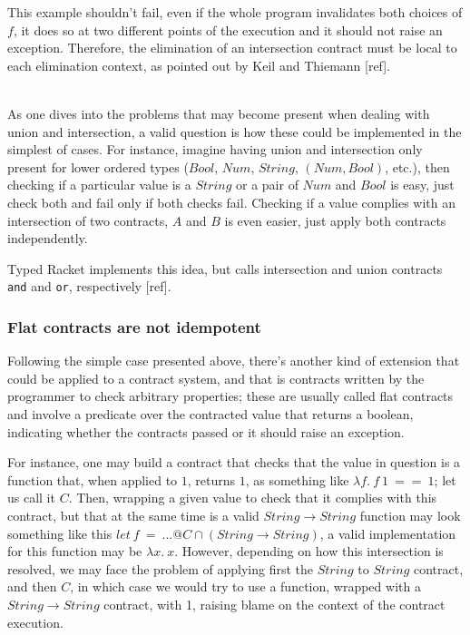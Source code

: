 This example shouldn't fail, even if the whole program invalidates both choices of $f$, it does
so at two different points of the execution and it should not raise an exception.
Therefore, the elimination of an intersection contract must be local to each elimination
context, as pointed out by Keil and Thiemann [ref].

\\


As one dives into the problems that may become present when dealing with union and intersection,
a valid question is how these could be implemented in the simplest of cases.
For instance, imagine having
union and intersection only present for lower ordered types 
($Bool$, $Num$, $String$, $(Num, Bool)$, etc.), then checking
if a particular value is a $String$ or a pair of $Num$ and $Bool$ is easy,
just check both and fail only if both checks fail.
Checking if a value complies with an intersection of two contracts, $A$ and $B$ is even
easier, just apply both contracts independently.

Typed Racket implements this idea, but calls intersection and union contracts
\texttt{and} and \texttt{or}, respectively [ref].


\subsubsection*{Flat contracts are not idempotent}

Following the simple case presented above, there's another kind of extension that could be
applied to a contract system, and that is contracts written by the
programmer to check arbitrary properties; these are usually called flat contracts and
involve a predicate over the contracted value that returns a boolean, indicating whether
the contracts passed or it should raise an exception.

For instance, one may build a contract that checks that the value in question is a
function that, when applied to $1$, returns $1$, as something like
$\lambda f.~f~1~==~1$; let us call it $C$.
Then, wrapping a given value to check that it complies with this contract, but that at
the same time is a valid $String \rightarrow String$ function may look something like this
$let~f~=~...@C \cap (String \rightarrow String)$, a valid implementation for this function
may be $\lambda x.~x$.
However, depending on how this intersection is resolved, we may face the problem of applying first
the $String$ to $String$ contract, and then $C$, in which case we would try to use a function,
wrapped with a $String \rightarrow String$ contract, with 1, raising blame on the context
of the contract execution.

